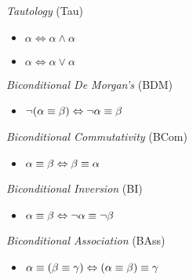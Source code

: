 \documentclass[../logic-text.tex]{subfiles}
\begin{document}
\bigskip



\emph{Tautology} (Tau)

\begin{itemize}
\item [] $\alpha \Leftrightarrow \alpha \land \alpha$
\item [] $\alpha \Leftrightarrow \alpha \vee \alpha$  
\end{itemize}

\bigskip




\emph{Biconditional De Morgan's} (BDM)

\begin{itemize}
\item [] $\neg ( \alpha \equiv \beta) \Leftrightarrow \neg \alpha \equiv \beta$
\end{itemize}

\bigskip



\emph{Biconditional Commutativity} (BCom)

\begin{itemize}
\item [] $\alpha \equiv \beta \Leftrightarrow \beta \equiv \alpha$
\end{itemize}

\bigskip




\emph{Biconditional Inversion} (BI)

\begin{itemize}
\item [] $\alpha \equiv \beta \Leftrightarrow \neg \alpha \equiv \neg \beta$
\end{itemize}

\bigskip






\emph{Biconditional Association} (BAss)

\begin{itemize}
\item [] $\alpha \equiv (\beta \equiv \gamma) \Leftrightarrow (\alpha \equiv \beta) \equiv \gamma$
\end{itemize}

\bigskip
\end{document}
